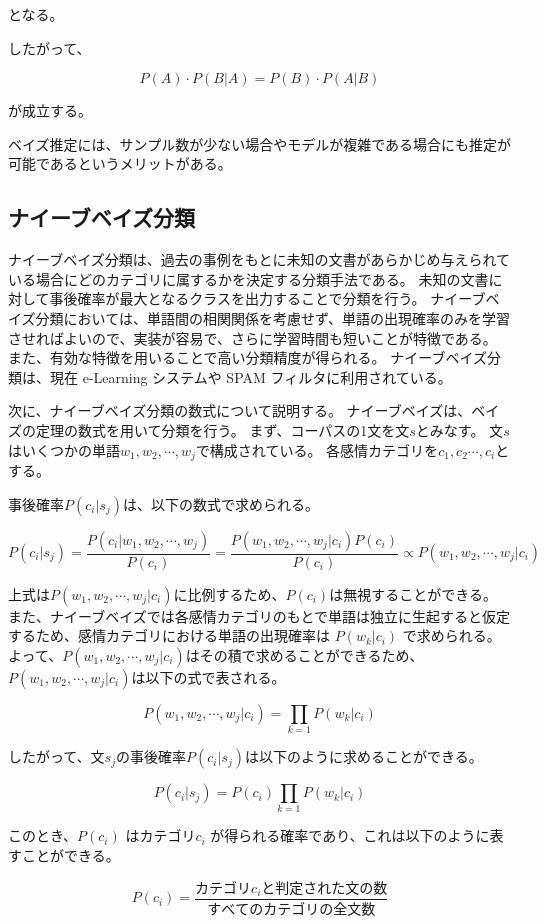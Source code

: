 \documentclass[11pt,a4j]{jsarticle}
\begin{document}
となる。

したがって、

\[ P(A) \cdot P(B|A)=P(B) \cdot P(A|B) \]

が成立する。

ベイズ推定には、サンプル数が少ない場合やモデルが複雑である場合にも推定が可能であるというメリットがある。

 \subsection{ナイーブベイズ分類}\label{sec:defnaivebayes}
ナイーブベイズ分類は、過去の事例をもとに未知の文書があらかじめ与えられている場合にどのカテゴリに属するかを決定する分類手法である。
未知の文書に対して事後確率が最大となるクラスを出力することで分類を行う。
ナイーブベイズ分類においては、単語間の相関関係を考慮せず、単語の出現確率のみを学習させればよいので、実装が容易で、さらに学習時間も短いことが特徴である。
また、有効な特徴を用いることで高い分類精度が得られる。
ナイーブベイズ分類は、現在 e-Learning システムや SPAM フィルタに利用されている。

次に、ナイーブベイズ分類の数式について説明する。
ナイーブベイズは、ベイズの定理の数式を用いて分類を行う。
まず、コーパスの1文を文$s$とみなす。
文$s$はいくつかの単語$w_1,w_2, \cdots ,w_j$で構成されている。
各感情カテゴリを$c_1,c_2 \cdots ,c_i$とする。

事後確率$P(c_i|s_j)$は、以下の数式で求められる。

\[
P(c_i|s_j)=\frac{P(c_i|w_1,w_2, \cdots ,w_j)}{P(c_i)}=\frac{P(w_1,w_2, \cdots ,w_j|c_i)P(c_i)}{P(c_i)} \propto P(w_1,w_2, \cdots ,w_j|c_i)
\]

上式は$P(w_1,w_2, \cdots ,w_j|c_i)$に比例するため、$P(c_i)$は無視することができる。
また、ナイーブベイズでは各感情カテゴリのもとで単語は独立に生起すると仮定するため、感情カテゴリにおける単語の出現確率は $P(w_k|c_i)$ で求められる。よって、$P(w_1,w_2, \cdots ,w_j|c_i)$はその積で求めることができるため、$P(w_1,w_2, \cdots ,w_j|c_i)$は以下の式で表される。

\[
P(w_1,w_2, \cdots ,w_j|c_i)=\prod_{k=1}P(w_k|c_i)
\]


したがって、文$s_j$の事後確率$P(c_i|s_j)$は以下のように求めることができる。

\[
P(c_i|s_j)=P(c_i)\prod_{k=1}P(w_k|c_i)
\]

このとき、$P(c_i)$ はカテゴリ$c_i$ が得られる確率であり、これは以下のように表すことができる。

\[
P(c_i)=\frac{カテゴリc_i と判定された文の数}{すべてのカテゴリの全文数}
\]
\end{document}
